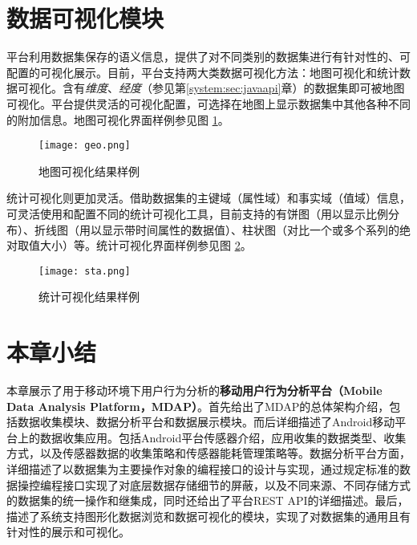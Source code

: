 \section{数据可视化模块}
\label{system:sec:vis}

平台利用数据集保存的语义信息，提供了对不同类别的数据集进行有针对性的、可配置的可视化展示。目前，平台支持两大类数据可视化方法：地图可视化和统计数据可视化。含有\emph{维度}、\emph{经度}（参见第\ref{system:sec:javaapi}章）的数据集即可被地图可视化。平台提供灵活的可视化配置，可选择在地图上显示数据集中其他各种不同的附加信息。地图可视化界面样例参见图
\ref{mdap:fig:map}。

\begin{figure}[htbp]
  \centering
    \texttt{[image: geo.png]}
  \caption{地图可视化结果样例}
  \label{mdap:fig:map}
\end{figure}
统计可视化则更加灵活。借助数据集的主键域（属性域）和事实域（值域）信息，可灵活使用和配置不同的统计可视化工具，目前支持的有饼图（用以显示比例分布）、折线图（用以显示带时间属性的数据值）、柱状图（对比一个或多个系列的绝对取值大小）等。统计可视化界面样例参见图
\ref{mdap:fig:sta}。


\begin{figure}[htbp]
  \centering
    \texttt{[image: sta.png]}
  \caption{统计可视化结果样例}
  \label{mdap:fig:sta}
\end{figure}

\section{本章小结}
\label{system:sec:conclusion}

本章展示了用于移动环境下用户行为分析的\textbf{移动用户行为分析平台（Mobile Data Analysis Platform，MDAP）}。首先给出了MDAP的总体架构介绍，包括数据收集模块、数据分析平台和数据展示模块。而后详细描述了Android移动平台上的数据收集应用。包括Android平台传感器介绍，应用收集的数据类型、收集方式，以及传感器数据的收集策略和传感器能耗管理策略等。数据分析平台方面，详细描述了以数据集为主要操作对象的编程接口的设计与实现，通过规定标准的数据操控编程接口实现了对底层数据存储细节的屏蔽，以及不同来源、不同存储方式的数据集的统一操作和继集成，同时还给出了平台REST API的详细描述。最后，描述了系统支持图形化数据浏览和数据可视化的模块，实现了对数据集的通用且有针对性的展示和可视化。